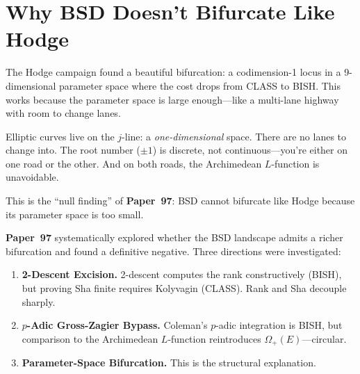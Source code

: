\documentclass[11pt,twoside,openany]{report}
\theoremstyle{remark}
\newcommand{\BISH}{\textsf{BISH}}
\newcommand{\CLASS}{\textsf{CLASS}}
\newcommand{\paperref}[1]{\textbf{Paper~#1}}
\begin{document}
\section{Why BSD Doesn't Bifurcate Like Hodge}

\begin{analogybox}
The Hodge campaign found a beautiful bifurcation: a codimension-1 locus in a 9-dimensional parameter space where the cost drops from \CLASS{} to \BISH. This works because the parameter space is large enough---like a multi-lane highway with room to change lanes.

Elliptic curves live on the $j$-line: a \emph{one-dimensional} space. There are no lanes to change into. The root number ($\pm 1$) is discrete, not continuous---you're either on one road or the other. And on both roads, the Archimedean $L$-function is unavoidable.

This is the ``null finding'' of \paperref{97}: BSD cannot bifurcate like Hodge because its parameter space is too small.
\end{analogybox}

\paperref{97} systematically explored whether the BSD landscape admits a richer bifurcation and found a definitive negative. Three directions were investigated:

\begin{enumerate}
  \item \textbf{2-Descent Excision.} 2-descent computes the rank constructively (\BISH), but proving Sha finite requires Kolyvagin (\CLASS). Rank and Sha decouple sharply.
  \item \textbf{$p$-Adic Gross-Zagier Bypass.} Coleman's $p$-adic integration is \BISH, but comparison to the Archimedean $L$-function reintroduces $\Omega_+(E)$---circular.
  \item \textbf{Parameter-Space Bifurcation.} This is the structural explanation.
\end{enumerate}
\end{document}

